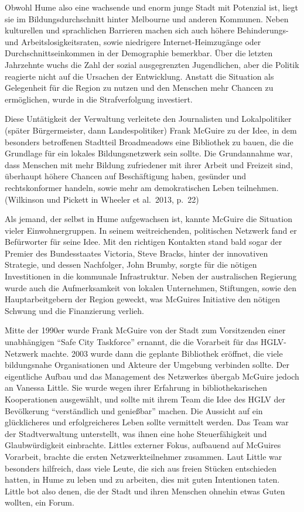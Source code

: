 \documentclass[a4paper,
fontsize=11pt,
oneside,
numbers=noperiodatend,
parskip=half-,
bibliography=totoc,
final
]{scrartcl}
\begin{document}
Obwohl Hume also eine wachsende und enorm junge Stadt mit Potenzial ist,
liegt sie im Bildungsdurchschnitt hinter Melbourne und anderen Kommunen.
Neben kulturellen und sprachlichen Barrieren machen sich auch höhere
Behinderungs- und Arbeitslosigkeitsraten, sowie niedrigere
Internet-Heimzugänge oder Durchschnittseinkommen in der Demographie
bemerkbar. Über die letzten Jahrzehnte wuchs die Zahl der sozial
ausgegrenzten Jugendlichen, aber die Politik reagierte nicht auf die
Ursachen der Entwicklung. Anstatt die Situation als Gelegenheit für die
Region zu nutzen und den Menschen mehr Chancen zu ermöglichen, wurde in
die Strafverfolgung investiert.

Diese Untätigkeit der Verwaltung verleitete den Journalisten und
Lokalpolitiker (später Bürgermeister, dann Landespolitiker) Frank
McGuire zu der Idee, in dem besonders betroffenen Stadtteil Broadmeadows
eine Bibliothek zu bauen, die die Grundlage für ein lokales
Bildungsnetzwerk sein sollte. Die Grundannahme war, dass Menschen mit
mehr Bildung zufriedener mit ihrer Arbeit und Freizeit sind, überhaupt
höhere Chancen auf Beschäftigung haben, gesünder und rechtskonformer
handeln, sowie mehr am demokratischen Leben teilnehmen. (Wilkinson und
Pickett in Wheeler et al.~2013, p.~22)

Als jemand, der selbst in Hume aufgewachsen ist, kannte McGuire die
Situation vieler Einwohnergruppen. In seinem weitreichenden, politischen
Netzwerk fand er Befürworter für seine Idee. Mit den richtigen Kontakten
stand bald sogar der Premier des Bundesstaates Victoria, Steve Bracks,
hinter der innovativen Strategie, und dessen Nachfolger, John Brumby,
sorgte für die nötigen Investitionen in die kommunale Infrastruktur.
Neben der australischen Regierung wurde auch die Aufmerksamkeit von
lokalen Unternehmen, Stiftungen, sowie den Hauptarbeitgebern der Region
geweckt, was McGuires Initiative den nötigen Schwung und die
Finanzierung verlieh.

Mitte der 1990er wurde Frank McGuire von der Stadt zum Vorsitzenden
einer unabhängigen \enquote{Safe City Taskforce} ernannt, die die
Vorarbeit für das HGLV-Netzwerk machte. 2003 wurde dann die geplante
Bibliothek eröffnet, die viele bildungsnahe Organisationen und Akteure
der Umgebung verbinden sollte. Der eigentliche Aufbau und das Management
des Netzwerkes übergab McGuire jedoch an Vanessa Little. Sie wurde wegen
ihrer Erfahrung in bibliothekarischen Kooperationen ausgewählt, und
sollte mit ihrem Team die Idee des HGLV der Bevölkerung
\enquote{verständlich und genießbar} machen. Die Aussicht auf ein
glücklicheres und erfolgreicheres Leben sollte vermittelt werden. Das
Team war der Stadtverwaltung unterstellt, was ihnen eine hohe
Steuerfähigkeit und Glaubwürdigkeit einbrachte. Littles externer Fokus,
aufbauend auf McGuires Vorarbeit, brachte die ersten Netzwerkteilnehmer
zusammen. Laut Little war besonders hilfreich, dass viele Leute, die
sich aus freien Stücken entschieden hatten, in Hume zu leben und zu
arbeiten, dies mit guten Intentionen taten. Little bot also denen, die
der Stadt und ihren Menschen ohnehin etwas Guten wollten, ein Forum.
\end{document}
